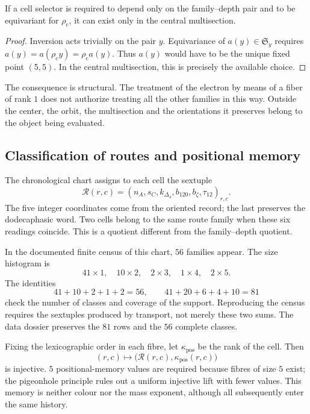 \begin{proposition}
If a cell selector is required to depend only on the family--depth pair
and to be equivariant for \(\rho_{\mathrm c}\), it can exist
only in the central multisection.
\end{proposition}
\begin{proof}
Inversion acts trivially on the pair \(y\). Equivariance of
\(a(y)\in\mathfrak S_y\) requires
\(a(y)=a(\rho_{\mathrm c}y)=\rho_{\mathrm c}a(y)\).
Thus \(a(y)\) would have to be the unique fixed point \((5,5)\).
In the central multisection, this is precisely the available choice.
\end{proof}

The consequence is structural. The treatment of the electron by means of a
fiber of rank \(1\) does not authorize treating all the other
families in this way. Outside the center, the orbit, the multisection and the orientations
it preserves belong to the object being evaluated.

\subsection{Classification of routes and positional memory}

The chronological chart assigns to each cell the sextuple
\[
 \mathcal R(r,c)=
 (n_A,s_C,k_{\Delta_4},b_{120},b_{\zeta},\tau_{12})_{r,c}.
\]
The five integer coordinates come from the oriented record; the last
preserves the dodecaphasic word. Two cells belong to the same route
family when these six readings coincide. This is a quotient different
from the family--depth quotient.

In the documented finite census of this chart, \(56\) families appear.
The size histogram is
\[
 41\times1,\quad10\times2,\quad2\times3,\quad1\times4,\quad2\times5.
\]
The identities
\[
 41+10+2+1+2=56,\qquad
 41+20+6+4+10=81
\]
check the number of classes and coverage of the support. Reproducing
the census requires the sextuples produced by transport, not merely these
two sums. The data dossier preserves the \(81\) rows and the
\(56\) complete classes.

Fixing the lexicographic order in each fibre, let \(\kappa_{\mathrm{pos}}\)
be the rank of the cell. Then
\[
 (r,c)\longmapsto\bigl(\mathcal R(r,c),\kappa_{\mathrm{pos}}(r,c)\bigr)
\]
is injective. \(5\) positional-memory values are required because
fibres of size \(5\) exist; the pigeonhole principle rules out a
uniform injective lift with fewer values. This memory is neither colour
nor the mass exponent, although all subsequently enter the same history.

